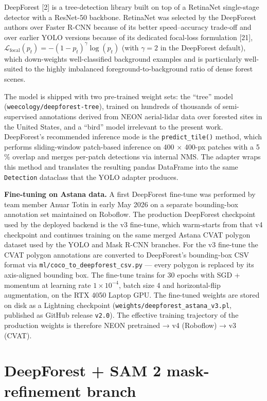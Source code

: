 DeepForest {[}2{]} is a tree-detection library built on top of a RetinaNet single-stage detector with a ResNet-50 backbone. RetinaNet was selected by the DeepForest authors over Faster R-CNN because of its better speed--accuracy trade-off and over earlier YOLO versions because of its dedicated focal-loss formulation {[}21{]}, \(\mathcal{L}_{\text{focal}}(p_t) = -(1 - p_t)^{\gamma} \log(p_t)\) (with \(\gamma = 2\) in the DeepForest default), which down-weights well-classified background examples and is particularly well-suited to the highly imbalanced foreground-to-background ratio of dense forest scenes.

The model is shipped with two pre-trained weight sets: the ``tree'' model (\texttt{weecology/deepforest-tree}), trained on hundreds of thousands of semi-supervised annotations derived from NEON aerial-lidar data over forested sites in the United States, and a ``bird'' model irrelevant to the present work. DeepForest's recommended inference mode is the \texttt{predict\_tile()} method, which performs sliding-window patch-based inference on 400 × 400-px patches with a 5 \% overlap and merges per-patch detections via internal NMS. The adapter wraps this method and translates the resulting pandas DataFrame into the same \texttt{Detection} dataclass that the YOLO adapter produces.

\textbf{Fine-tuning on Astana data.} A first DeepForest fine-tune was performed by team member Anuar Totin in early May 2026 on a separate bounding-box annotation set maintained on Roboflow. The production DeepForest checkpoint used by the deployed backend is the v3 fine-tune, which warm-starts from that v4 checkpoint and continues training on the same merged Astana CVAT polygon dataset used by the YOLO and Mask R-CNN branches. For the v3 fine-tune the CVAT polygon annotations are converted to DeepForest's bounding-box CSV format via \texttt{ml/coco\_to\_deepforest\_csv.py} --- every polygon is replaced by its axis-aligned bounding box. The fine-tune trains for 30 epochs with SGD + momentum at learning rate \(1 \times 10^{-4}\), batch size 4 and horizontal-flip augmentation, on the RTX 4050 Laptop GPU. The fine-tuned weights are stored on disk as a Lightning checkpoint (\texttt{weights/deepforest\_astana\_v3.pl}, published as GitHub release \texttt{v2.0}). The effective training trajectory of the production weights is therefore NEON pretrained → v4 (Roboflow) → v3 (CVAT).

\section{DeepForest + SAM 2 mask-refinement branch}\label{deepforest-sam-2-mask-refinement-branch}

